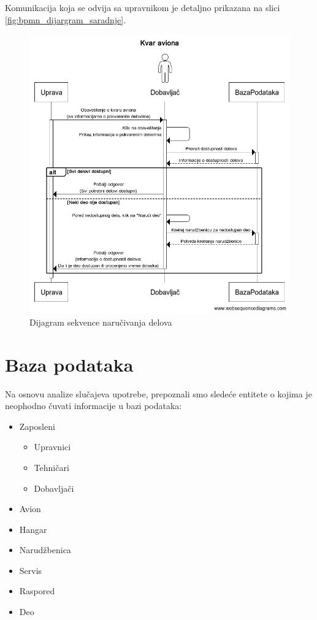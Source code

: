 \documentclass[a4paper]{article}
\begin{document}
Komunikacija koja se odvija sa upravnikom je detaljno prikazana na slici \ref{fig:bpmn_dijargram_saradnje}.
\begin{figure}[H]
\begin{center}
\includegraphics[scale=0.4]{Dijagrami/Dijagrami_sekvence/Dijagram_sekvenci_narucivanje_delova.png}
\end{center}
\caption{Dijagram sekvence naručivanja delova}
\label{fig:ds_narucivanje_delova}
\end{figure}

\pagebreak

\section{Baza podataka}
\label{sec:baza_podataka}

Na osnovu analize slučajeva upotrebe, prepoznali smo sledeće entitete o kojima je neophodno čuvati informacije u bazi podataka:
\begin{itemize}
    \item Zaposleni
        \begin{itemize}[label=-]
            \item Upravnici
            \item Tehničari
            \item Dobavljači
        \end{itemize}
    \item Avion
    \item Hangar
    \item Narudžbenica
    \item Servis
    \item Raspored
    \item Deo
\end{itemize}
\end{document}
